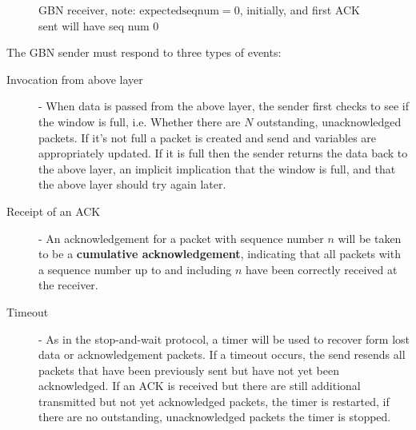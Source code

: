\documentclass[12pt letter]{report}
\begin{document}
\begin{figure}[H]
  \centering
  \caption{GBN receiver, note: $\text{expectedseqnum} = 0$,
  initially, and first ACK sent will have seq num 0}
\end{figure}

The GBN sender must respond to three types of events:
\begin{description}
  \item[Invocation from above layer] - When data is passed from the
    above layer, the sender first checks to see if the window is
    full, i.e. Whether there are $N$ outstanding, unacknowledged
    packets. If it's not full a packet is created and send and
    variables are appropriately updated. If it is full then the
    sender returns the data back to the above layer, an implicit
    implication that the window is full, and that the above layer
    should try again later.
  \item[Receipt of an ACK] - An acknowledgement for a packet with
    sequence number $n$ will be taken to be a \textbf{cumulative
    acknowledgement}, indicating that all packets with a sequence
    number up to and including $n$ have been correctly received at the receiver.
  \item[Timeout] - As in the stop-and-wait protocol, a timer will be
    used to recover form lost data or acknowledgement packets. If a
    timeout occurs, the send resends all packets that have been
    previously sent but have not yet been acknowledged. If an ACK is
    received but there are still additional transmitted but not yet
    acknowledged packets, the timer is restarted, if there are no
    outstanding, unacknowledged packets the timer is stopped.
\end{description}
\end{document}
